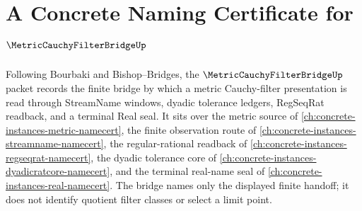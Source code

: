 \chapter{A Concrete Naming Certificate for $\MetricCauchyFilterBridgeUp$}
\label{ch:concrete-instances-metric-cauchy-filter-bridge-namecert}

Following Bourbaki and Bishop--Bridges, the $\MetricCauchyFilterBridgeUp$ packet records the finite bridge by which a metric Cauchy-filter presentation is read through StreamName windows, dyadic tolerance ledgers, RegSeqRat readback, and a terminal Real seal. It sits over the metric source of \autoref{ch:concrete-instances-metric-namecert}, the finite observation route of \autoref{ch:concrete-instances-streamname-namecert}, the regular-rational readback of \autoref{ch:concrete-instances-regseqrat-namecert}, the dyadic tolerance core of \autoref{ch:concrete-instances-dyadicratcore-namecert}, and the terminal real-name seal of \autoref{ch:concrete-instances-real-namecert}. The bridge names only the displayed finite handoff; it does not identify quotient filter classes or select a limit point.

